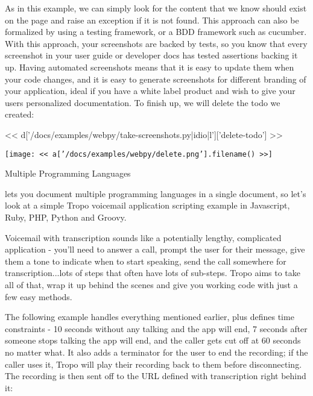 \documentclass[custom, plainsections]{sciposter}
\begin{document}
\begin{multicols*}{2}
As in this example, we can simply look for the content that we know should exist on the page and raise an exception if it is not found. This approach can also be formalized by using a testing framework, or a BDD framework such as cucumber. With this approach, your screenshots are backed by tests, so you know that every screenshot in your user guide or developer docs has tested assertions backing it up. Having automated screenshots means that it is easy to update them when your code changes, and it is easy to generate screenshots for different branding of your application, ideal if you have a white label product and wish to give your users personalized documentation. To finish up, we will delete the todo we created:

<< d['/docs/examples/webpy/take-screenshots.py|idio|l']['delete-todo'] >>

\texttt{[image: << a['/docs/examples/webpy/delete.png'].filename() >>]}

\pagebreak

\large
Multiple Programming Languages
\small

\vspace{5pt}

\label{sec:multiple-languages}
 lets you document multiple programming languages in a single document, so let's look at a simple Tropo voicemail application scripting example in Javascript, Ruby, PHP, Python and Groovy.

Voicemail with transcription sounds like a potentially lengthy, complicated application - you'll need to answer a call, prompt the user for their message, give them a tone to indicate when to start speaking, send the call somewhere for transcription...lots of steps that often have lots of sub-steps. Tropo aims to take all of that, wrap it up behind the scenes and give you working code with just a few easy methods.

The following example handles everything mentioned earlier, plus defines time constraints - 10 seconds without any talking and the app will end, 7 seconds after someone stops talking the app will end, and the caller gets cut off at 60 seconds no matter what. It also adds a terminator for the user to end the recording; if the caller uses it, Tropo will play their recording back to them before disconnecting. The recording is then sent off to the URL defined with transcription right behind it:

\vspace{10pt}


\end{multicols*}
\end{document}
